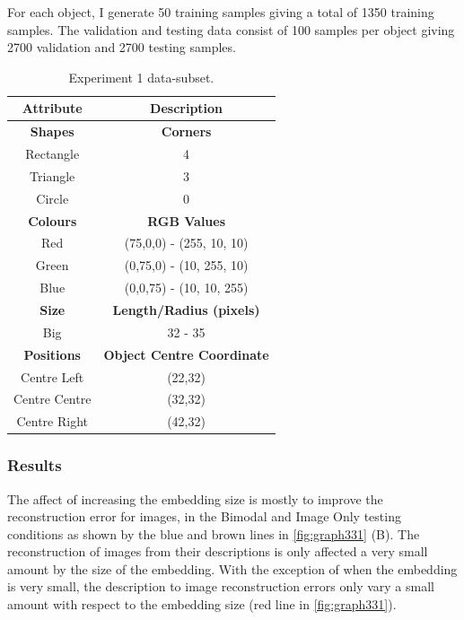 For each object, I generate 50 training samples giving a total of 1350 training samples. The validation and testing data consist of 100 samples per object giving 2700 validation and 2700 testing samples.



\begin{table}[ht]
\centering
\begin{tabular}{|c|c|}
\hline
\textbf{Attribute} & \textbf{Description} \\ \hline \hline
\textbf{Shapes} & \textbf{Corners} \\ \hline
Rectangle & 4\\ \hline
Triangle & 3\\ \hline
Circle & 0\\ \hline 

\textbf{Colours} & \textbf{RGB Values}	\\ \hline	
Red & (75,0,0) - (255, 10, 10)\\ \hline
Green  & (0,75,0) - (10, 255, 10)\\ \hline
Blue   & (0,0,75) - (10, 10, 255)\\ \hline


\textbf{Size} & 	\textbf{Length/Radius (pixels)} \\ \hline			  
Big    & 32 - 35  \\ \hline


\textbf{Positions} & \textbf{Object Centre Coordinate}	\\ \hline				  
Centre Left &(22,32)\\ \hline
Centre Centre & (32,32)\\ \hline
Centre Right &(42,32)\\ \hline
				
\end{tabular}
\caption{Experiment 1 data-subset.}
\label{tab:exp1_data} 
\end{table}

\subsubsection{Results}

The affect of increasing the embedding size is mostly to improve the reconstruction error for images, in the Bimodal and Image Only testing conditions as shown by the blue and brown lines in \autoref{fig:graph331} (B). The reconstruction of images from their descriptions is only affected a very small amount by the size of the embedding. With the exception of when the embedding is very small, the description to image reconstruction errors only vary a small amount with respect to the embedding size (red line in \autoref{fig:graph331}). 

